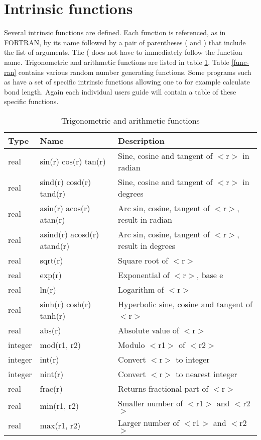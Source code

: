 \section{Intrinsic functions \label{func}}

Several intrinsic functions are defined.  Each function is
referenced, as in FORTRAN, by its name followed by a pair of
parentheses ( and ) that include the list of arguments. The ( does
not have to immediately follow the function name.  Trigonometric and
arithmetic functions are listed in table \ref{func-trig}.  Table
\ref{func-ran} contains various random number generating functions.
Some programs such as \Discus have a set of specific intrinsic 
functions allowing one to for example calculate bond length. Again 
each individual users guide will contain a table of these specific
functions.

\begin{table}[!tbh]
\centering
\begin{tabularx}{\textwidth}{|p{12mm}|p{45mm}|X|}
  \hline
  {\bf Type} & {\bf Name} & {\bf Description} \\
  \hline\hline
  real & sin(r) cos(r) tan(r) &
         Sine, cosine and tangent of $<$r$>$ in radian \\
  real & sind(r) cosd(r) tand(r) &
         Sine, cosine and tangent of $<$r$>$ in degrees \\
  real & asin(r) acos(r) atan(r) &
         Arc sin, cosine, tangent of $<$r$>$, result in radian \\
  real & asind(r) acosd(r) atand(r) &
         Arc sin, cosine, tangent of $<$r$>$, result in degrees \\
  \hline
  real & sqrt(r) & Square root of $<$r$>$ \\
  real & exp(r) &  Exponential of $<$r$>$, base e \\
  real & ln(r) &   Logarithm of $<$r$>$ \\
  real & sinh(r) cosh(r) tanh(r) &
                   Hyperbolic sine, cosine and tangent of $<$r$>$ \\
  \hline
  real    & abs(r)      &  Absolute value of $<$r$>$ \\
  integer & mod(r1, r2) &  Modulo $<$r1$>$ of $<$r2$>$ \\
  integer & int(r)      &  Convert $<$r$>$ to integer \\
  integer & nint(r)     &  Convert $<$r$>$ to nearest integer \\
  real    & frac(r)     &  Returns fractional part of $<$r$>$ \\
  \hline
  real    & min(r1, r2) &  Smaller number of $<$r1$>$ and $<$r2$>$ \\
  real    & max(r1, r2) &  Larger number of $<$r1$>$ and $<$r2$>$ \\
  \hline
\end{tabularx}
\caption{\label{func-trig}Trigonometric and arithmetic functions}
\end{table}

